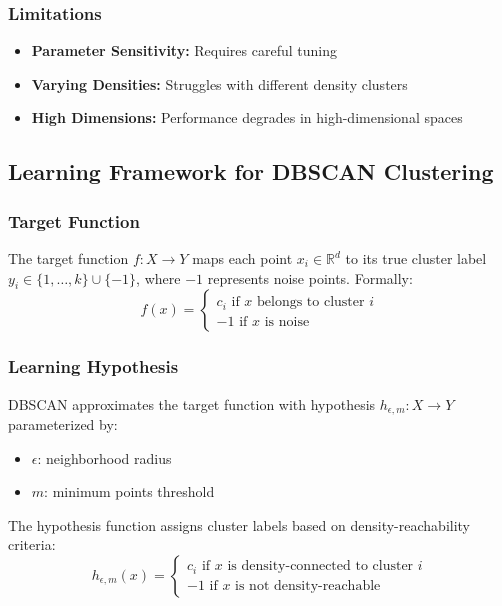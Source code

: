 \documentclass[a4paper, 11pt]{article}
\begin{document}
\subsubsection{Limitations}
\begin{itemize}
    \item \textbf{Parameter Sensitivity:} Requires careful tuning
    \item \textbf{Varying Densities:} Struggles with different density clusters
    \item \textbf{High Dimensions:} Performance degrades in high-dimensional spaces
\end{itemize}

\subsection{Learning Framework for DBSCAN Clustering}

\subsubsection{Target Function}
The target function $f: X \rightarrow Y$ maps each point $x_i \in \mathbb{R}^d$ to its true cluster label $y_i \in \{1,\ldots,k\} \cup \{-1\}$, where $-1$ represents noise points. Formally:
\[f(x) = \begin{cases} 
      c_i  \text{ if } x \text{ belongs to cluster } i \\
      -1  \text{ if } x \text{ is noise}
   \end{cases}\]

\subsubsection{Learning Hypothesis}
DBSCAN approximates the target function with hypothesis $h_{\epsilon,m}: X \rightarrow Y$ parameterized by:
\begin{itemize}
    \item $\epsilon$: neighborhood radius
    \item $m$: minimum points threshold
\end{itemize}
The hypothesis function assigns cluster labels based on density-reachability criteria:
\[h_{\epsilon,m}(x) = \begin{cases} 
      c_i  \text{ if } x \text{ is density-connected to cluster } i \\
      -1  \text{ if } x \text{ is not density-reachable}
   \end{cases}\]
\end{document}
